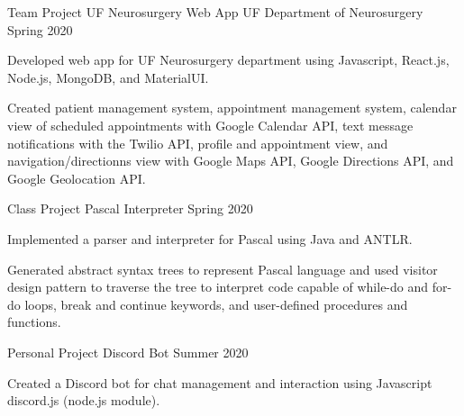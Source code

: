 

\begin{cventries}

  \cventry
    {Team Project} %
    {UF Neurosurgery Web App} %
    {UF Department of Neurosurgery} %
    {Spring 2020} %
    {
      \begin{cvitems} %
        \item {Developed web app for UF Neurosurgery department using Javascript, React.js, Node.js, MongoDB, and MaterialUI. }
        \item {Created patient management system, appointment management system, calendar view of scheduled appointments with Google Calendar API, text message notifications with the Twilio API, profile and appointment view, and navigation/directionns view with Google Maps API, Google Directions API, and Google Geolocation API.}
      \end{cvitems}
    }
    
     \cventry
    {Class Project} %
    {Pascal Interpreter} %
    {} %
    {Spring 2020} %
    {
      \begin{cvitems} %
        \item {Implemented a parser and interpreter for Pascal using Java and ANTLR.}
        \item {Generated abstract syntax trees to represent Pascal language and used visitor design pattern to traverse the tree to interpret code capable of while-do and for-do loops, break and continue keywords, and user-defined procedures and functions.}
      \end{cvitems}
    }
    
     \cventry
    {Personal Project} %
    {Discord Bot} %
    {} %
    {Summer 2020} %
    {
      \begin{cvitems} %
        \item {Created a Discord bot for chat management and interaction using Javascript discord.js (node.js module).}
      \end{cvitems}
    }




\end{cventries}
